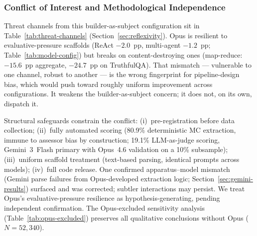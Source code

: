 
\subsubsection{Conflict of Interest and Methodological Independence}
\label{sec:coi}

Threat channels from this builder-as-subject configuration sit in Table~\ref{tab:threat-channels} (Section~\ref{sec:reflexivity}).  Opus is resilient to evaluative-pressure scaffolds (ReAct $-2.0$~pp, multi-agent $-1.2$~pp; Table~\ref{tab:model-config}) but breaks on content-destroying ones (map-reduce: $-15.6$~pp aggregate, $-24.7$~pp on TruthfulQA).  That mismatch --- vulnerable to one channel, robust to another --- is the wrong fingerprint for pipeline-design bias, which would push toward roughly uniform improvement across configurations.  It weakens the builder-as-subject concern; it does not, on its own, dispatch it.

Structural safeguards constrain the conflict: (i)~pre-registration before data collection; (ii)~fully automated scoring (80.9\% deterministic MC extraction, immune to assessor bias by construction; 19.1\% LLM-as-judge scoring, Gemini~3~Flash primary with Opus~4.6 validation on a 10\% subsample); (iii)~uniform scaffold treatment (text-based parsing, identical prompts across models); (iv)~full code release.  One confirmed apparatus--model mismatch (Gemini parse failures from Opus-developed extraction logic; Section~\ref{sec:gemini-results}) surfaced and was corrected; subtler interactions may persist.  We treat Opus's evaluative-pressure resilience as hypothesis-generating, pending independent confirmation.  The Opus-excluded sensitivity analysis (Table~\ref{tab:opus-excluded}) preserves all qualitative conclusions without Opus ($N = 52{,}340$).